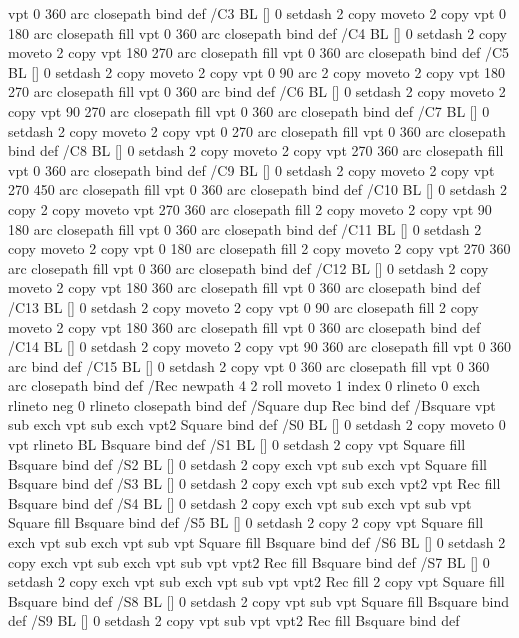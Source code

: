 {{{	vpt 0 360 arc closepath} bind def
/C3 {BL [] 0 setdash 2 copy moveto
	2 copy vpt 0 180 arc closepath fill
	vpt 0 360 arc closepath} bind def
/C4 {BL [] 0 setdash 2 copy moveto
	2 copy vpt 180 270 arc closepath fill
	vpt 0 360 arc closepath} bind def
/C5 {BL [] 0 setdash 2 copy moveto
	2 copy vpt 0 90 arc
	2 copy moveto
	2 copy vpt 180 270 arc closepath fill
	vpt 0 360 arc} bind def
/C6 {BL [] 0 setdash 2 copy moveto
	2 copy vpt 90 270 arc closepath fill
	vpt 0 360 arc closepath} bind def
/C7 {BL [] 0 setdash 2 copy moveto
	2 copy vpt 0 270 arc closepath fill
	vpt 0 360 arc closepath} bind def
/C8 {BL [] 0 setdash 2 copy moveto
	2 copy vpt 270 360 arc closepath fill
	vpt 0 360 arc closepath} bind def
/C9 {BL [] 0 setdash 2 copy moveto
	2 copy vpt 270 450 arc closepath fill
	vpt 0 360 arc closepath} bind def
/C10 {BL [] 0 setdash 2 copy 2 copy moveto vpt 270 360 arc closepath fill
	2 copy moveto
	2 copy vpt 90 180 arc closepath fill
	vpt 0 360 arc closepath} bind def
/C11 {BL [] 0 setdash 2 copy moveto
	2 copy vpt 0 180 arc closepath fill
	2 copy moveto
	2 copy vpt 270 360 arc closepath fill
	vpt 0 360 arc closepath} bind def
/C12 {BL [] 0 setdash 2 copy moveto
	2 copy vpt 180 360 arc closepath fill
	vpt 0 360 arc closepath} bind def
/C13 {BL [] 0 setdash 2 copy moveto
	2 copy vpt 0 90 arc closepath fill
	2 copy moveto
	2 copy vpt 180 360 arc closepath fill
	vpt 0 360 arc closepath} bind def
/C14 {BL [] 0 setdash 2 copy moveto
	2 copy vpt 90 360 arc closepath fill
	vpt 0 360 arc} bind def
/C15 {BL [] 0 setdash 2 copy vpt 0 360 arc closepath fill
	vpt 0 360 arc closepath} bind def
/Rec {newpath 4 2 roll moveto 1 index 0 rlineto 0 exch rlineto
	neg 0 rlineto closepath} bind def
/Square {dup Rec} bind def
/Bsquare {vpt sub exch vpt sub exch vpt2 Square} bind def
/S0 {BL [] 0 setdash 2 copy moveto 0 vpt rlineto BL Bsquare} bind def
/S1 {BL [] 0 setdash 2 copy vpt Square fill Bsquare} bind def
/S2 {BL [] 0 setdash 2 copy exch vpt sub exch vpt Square fill Bsquare} bind def
/S3 {BL [] 0 setdash 2 copy exch vpt sub exch vpt2 vpt Rec fill Bsquare} bind def
/S4 {BL [] 0 setdash 2 copy exch vpt sub exch vpt sub vpt Square fill Bsquare} bind def
/S5 {BL [] 0 setdash 2 copy 2 copy vpt Square fill
	exch vpt sub exch vpt sub vpt Square fill Bsquare} bind def
/S6 {BL [] 0 setdash 2 copy exch vpt sub exch vpt sub vpt vpt2 Rec fill Bsquare} bind def
/S7 {BL [] 0 setdash 2 copy exch vpt sub exch vpt sub vpt vpt2 Rec fill
	2 copy vpt Square fill Bsquare} bind def
/S8 {BL [] 0 setdash 2 copy vpt sub vpt Square fill Bsquare} bind def
/S9 {BL [] 0 setdash 2 copy vpt sub vpt vpt2 Rec fill Bsquare} bind def
}}
